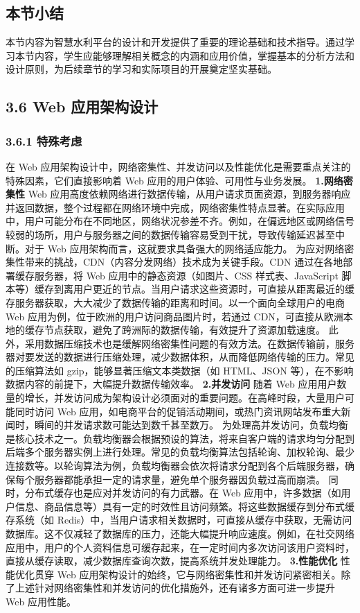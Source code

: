 \subsection{本节小结}\label{ux672cux8282ux5c0fux7ed3} 本节内容为智慧水利平台的设计和开发提供了重要的理论基础和技术指导。通过学习本节内容，学生应能够理解相关概念的内涵和应用价值，掌握基本的分析方法和设计原则，为后续章节的学习和实际项目的开展奠定坚实基础。

\subsection{3.6 Web 应用架构设计}\label{web-ux5e94ux7528ux67b6ux6784ux8bbeux8ba1} \subsubsection{3.6.1 特殊考虑}\label{ux7279ux6b8aux8003ux8651} 在 Web 应用架构设计中，网络密集性、并发访问以及性能优化是需要重点关注的特殊因素，它们直接影响着 Web 应用的用户体验、可用性与业务发展。 \textbf{1.网络密集性} Web 应用高度依赖网络进行数据传输，从用户请求页面资源，到服务器响应并返回数据，整个过程都在网络环境中完成，网络密集性特点显著。在实际应用中，用户可能分布在不同地区，网络状况参差不齐。例如，在偏远地区或网络信号较弱的场所，用户与服务器之间的数据传输容易受到干扰，导致传输延迟甚至中断。对于 Web 应用架构而言，这就要求具备强大的网络适应能力。 为应对网络密集性带来的挑战，CDN（内容分发网络）技术成为关键手段。CDN 通过在各地部署缓存服务器，将 Web 应用中的静态资源（如图片、CSS 样式表、JavaScript 脚本等）缓存到离用户更近的节点。当用户请求这些资源时，可直接从距离最近的缓存服务器获取，大大减少了数据传输的距离和时间。以一个面向全球用户的电商 Web 应用为例，位于欧洲的用户访问商品图片时，若通过 CDN，可直接从欧洲本地的缓存节点获取，避免了跨洲际的数据传输，有效提升了资源加载速度。 此外，采用数据压缩技术也是缓解网络密集性问题的有效方法。在数据传输前，服务器对要发送的数据进行压缩处理，减少数据体积，从而降低网络传输的压力。常见的压缩算法如 gzip，能够显著压缩文本类数据（如 HTML、JSON 等），在不影响数据内容的前提下，大幅提升数据传输效率。 \textbf{2.并发访问} 随着 Web 应用用户数量的增长，并发访问成为架构设计必须面对的重要问题。在高峰时段，大量用户可能同时访问 Web 应用，如电商平台的促销活动期间，或热门资讯网站发布重大新闻时，瞬间的并发请求数可能达到数千甚至数万。 为处理高并发访问，负载均衡是核心技术之一。负载均衡器会根据预设的算法，将来自客户端的请求均匀分配到后端多个服务器实例上进行处理。常见的负载均衡算法包括轮询、加权轮询、最少连接数等。以轮询算法为例，负载均衡器会依次将请求分配到各个后端服务器，确保每个服务器都能承担一定的请求量，避免单个服务器因负载过高而崩溃。 同时，分布式缓存也是应对并发访问的有力武器。在 Web 应用中，许多数据（如用户信息、商品信息等）具有一定的时效性且访问频繁。将这些数据缓存到分布式缓存系统（如 Redis）中，当用户请求相关数据时，可直接从缓存中获取，无需访问数据库。这不仅减轻了数据库的压力，还能大幅提升响应速度。例如，在社交网络应用中，用户的个人资料信息可缓存起来，在一定时间内多次访问该用户资料时，直接从缓存读取，减少数据库查询次数，提高系统并发处理能力。 \textbf{3.性能优化} 性能优化贯穿 Web 应用架构设计的始终，它与网络密集性和并发访问紧密相关。除了上述针对网络密集性和并发访问的优化措施外，还有诸多方面可进一步提升 Web 应用性能。 